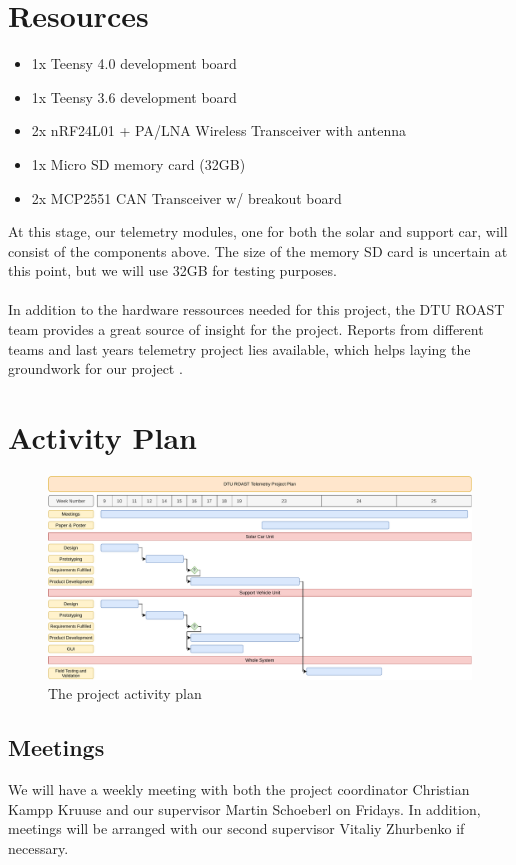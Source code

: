\documentclass[]{article}
\begin{document}
\section{Resources}
\begin{itemize}
    \item 1x Teensy 4.0 development board
    \item 1x Teensy 3.6 development board
    \item 2x nRF24L01 + PA/LNA Wireless Transceiver with antenna
    \item 1x Micro SD memory card (32GB)
    \item 2x MCP2551 CAN Transceiver w/ breakout board
\end{itemize}
At this stage, our telemetry modules, one for both the solar and support car, will consist of the components above. The size of the memory SD card is uncertain at this point, but we will use 32GB for testing purposes.\\
\\
In addition to the hardware ressources needed for this project, the DTU ROAST team provides a great source of insight for the project. Reports from different teams and last years telemetry project lies available, which helps laying the groundwork for our project \cite{ROAST}.

\section{Activity Plan}
\begin{figure}[H]
    \centering
    \includegraphics[width=\textwidth]{documentation/images/projectPlan.pdf}
    \caption{The project activity plan}
    \label{fig:my_label}
\end{figure}
\subsection*{Meetings}
We will have a weekly meeting with both the project coordinator Christian Kampp Kruuse and our supervisor Martin Schoeberl on Fridays. In addition, meetings will be arranged with our second supervisor Vitaliy Zhurbenko if necessary. 
\end{document}
